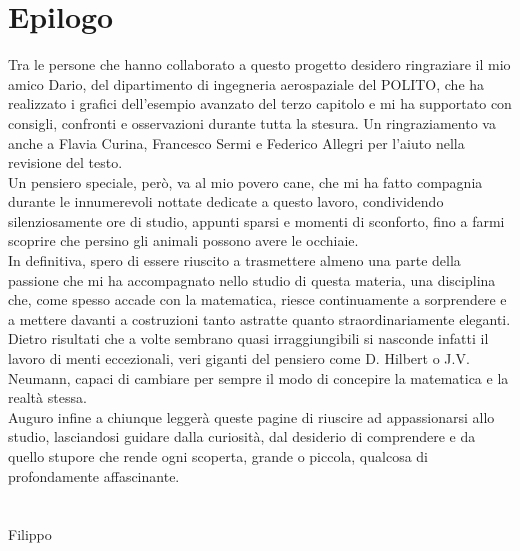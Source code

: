 \documentclass[a4paper,12pt]{report}
\begin{document}
\newpage

\chapter*{Epilogo}

Tra le persone che hanno collaborato a questo progetto desidero ringraziare il mio amico Dario, del dipartimento di ingegneria aerospaziale del POLITO, che ha realizzato i grafici dell’esempio avanzato del terzo capitolo e mi ha supportato con consigli, confronti e osservazioni durante tutta la stesura. Un ringraziamento va anche a Flavia Curina, Francesco Sermi e Federico Allegri per l’aiuto nella revisione del testo.
\\Un pensiero speciale, però, va al mio povero cane, che mi ha fatto compagnia durante le innumerevoli nottate dedicate a questo lavoro, condividendo silenziosamente ore di studio, appunti sparsi e momenti di sconforto, fino a farmi scoprire che persino gli animali possono avere le occhiaie.
\\In definitiva, spero di essere riuscito a trasmettere almeno una parte della passione che mi ha accompagnato nello studio di questa materia, una disciplina che, come spesso accade con la matematica, riesce continuamente a sorprendere e a mettere davanti a costruzioni tanto astratte quanto straordinariamente eleganti. Dietro risultati che a volte sembrano quasi irraggiungibili si nasconde infatti il lavoro di menti eccezionali, veri giganti del pensiero come D. Hilbert o J.V. Neumann, capaci di cambiare per sempre il modo di concepire la matematica e la realtà stessa.
\\Auguro infine a chiunque leggerà queste pagine di riuscire ad appassionarsi allo studio, lasciandosi guidare dalla curiosità, dal desiderio di comprendere e da quello stupore che rende ogni scoperta, grande o piccola, qualcosa di profondamente affascinante.
\\
\\
\\Filippo
\end{document}
